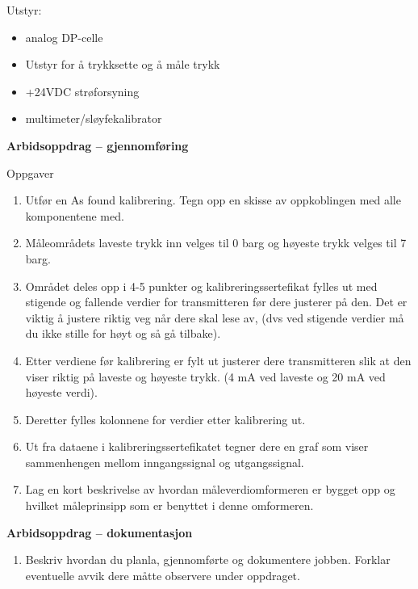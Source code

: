 Utstyr:
\begin{itemize}[noitemsep]
	\item analog DP-celle 
	\item Utstyr for å trykksette og å måle trykk 
	\item +24VDC strøforsyning 
	\item multimeter/sløyfekalibrator
\end{itemize}

\textbf{Arbidsoppdrag -- gjennomføring}

Oppgaver\begin{enumerate}
	\item Utfør en As found kalibrering. Tegn opp en skisse av oppkoblingen med alle komponentene med.
	\item Måleområdets laveste trykk inn velges til 0 barg og høyeste trykk velges til 7 barg.
	\item Området deles opp i 4-5 punkter og kalibreringssertefikat fylles ut med stigende og fallende verdier for transmitteren før dere justerer på den. Det er viktig å justere riktig veg når dere skal lese av, (dvs ved stigende verdier må du ikke stille for høyt og så gå tilbake). 
	\item Etter verdiene før kalibrering er fylt ut justerer dere transmitteren slik at den viser riktig på laveste og høyeste trykk. (4 mA ved laveste og 20 mA ved høyeste verdi).
	\item Deretter fylles kolonnene for verdier etter kalibrering ut.
	\item Ut fra dataene i kalibreringssertefikatet tegner dere en graf som viser sammenhengen mellom inngangssignal og utgangssignal.
	\item Lag en kort beskrivelse av hvordan måleverdiomformeren er bygget opp og hvilket måleprinsipp som er benyttet i denne omformeren.
\end{enumerate}
\textbf{Arbidsoppdrag -- dokumentasjon}

\begin{enumerate}
	\item Beskriv hvordan du planla, gjennomførte og dokumentere jobben. Forklar eventuelle avvik dere måtte observere under oppdraget. 
\end{enumerate}









\noindent

\vfil \eject

















